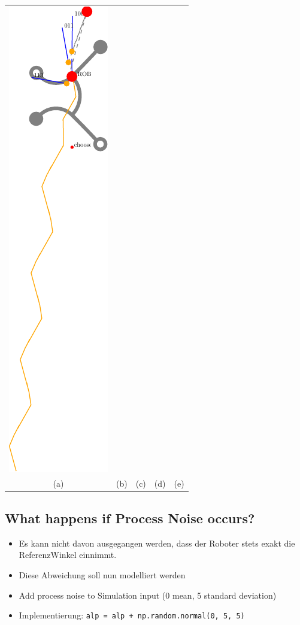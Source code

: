 \documentclass[10pt,a4paper]{article}
\begin{document}
\begin{tabular}{ccccc}
\includegraphics[scale=.8]{pics/pathplanner_without_noise/example_straight/dec_80.pdf}
\\
(a) & (b) & (c) & (d) & (e) 
\\
\end{tabular}



\subsection{What happens if Process Noise occurs?}

\begin{itemize}

	\item Es kann nicht davon ausgegangen werden, dass der Roboter stets exakt die ReferenzWinkel einnimmt.
	
	\item Diese Abweichung soll nun modelliert werden

	\item Add process noise to Simulation input (0 mean, 5 standard deviation)
	
	\item Implementierung: \texttt{alp = alp + np.random.normal(0, 5, 5)}

\end{itemize}
\end{document}
